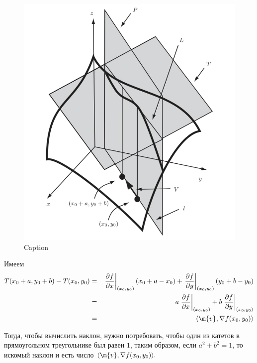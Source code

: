 \begin{figure}[h!]
    \centering
    \includegraphics[scale =0.7]{images/direction_der2.jpg}
    \caption{Caption}
    \label{fig:enter-label}
\end{figure}



Имеем
\begin{eqnarray*}
    T(x_0 + a, y_0 + b) - T(x_0,y_0) &=& \left.\frac{\partial f}{\partial x}\right|_{(x_0,y_0)} (x_0 +a-x_0) + \left.\frac{\partial f}{\partial y}\right|_{(x_0,y_0)} (y_0 +b-y_0) \\
    &=& a\left.\frac{\partial f}{\partial x}\right|_{(x_0,y_0)} + b\left.\frac{\partial f}{\partial y}\right|_{(x_0,y_0)} \\
    &=& \langle \m{v} , \nabla f (x_0, y_0) \rangle
\end{eqnarray*}




Тогда, чтобы вычислить наклон, нужно потребовать, чтобы один из катетов в прямоугольном треугольнике был равен $1$, таким образом, если $a^2 + b^2 = 1$, то искомый наклон и есть число $\langle \m{v} , \nabla f (x_0, y_0) \rangle.$

